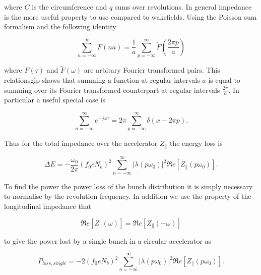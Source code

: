 \documentclass[12pt,a4paper,twopage,openright]{report}
\begin{document}
where $C$ is the circumference and $q$ sums over revolutions. In general impedance is the more useful property to use compared to wakefields. Using the Poisson sum formalism and the following identity

\begin{equation}
\displaystyle\sum\limits_{n = -\infty}^{\infty} F \left( n a \right) = \frac{1}{a} \displaystyle\sum\limits_{p = -\infty}^{\infty} \tilde{F} \left( \frac{2\pi p}{a} \right)
\end{equation}

where $F(\tau)$ and $\tilde{F}(\omega)$ are arbitary Fourier transformed pairs. This relationsgip shows that summing a function at regular intervals $a$ is equal to summing over its Fourier transformed counterpart at regular intervals $\frac{2 \pi}{a}$. In particular a useful special case is

\begin{equation}
\displaystyle\sum\limits_{n = -\infty}^{\infty} e^{-j\omega \tau} = 2\pi \displaystyle\sum\limits_{p = -\infty}^{\infty} \delta \left( x - 2\pi p \right).
\end{equation}

Thus for the total impedance over the accelerator $Z_{\parallel}$ the energy loss is

\begin{equation}
\Delta E = -\frac{\omega_{0}}{2\pi} \left( f_{0} e N_{b}\right)^{2} \displaystyle\sum\limits_{n = -\infty}^{\infty}  \left| \lambda \left( p \omega_{0} \right)  \right|^{2} \Re{}e \left[ Z_{\parallel} \left( p \omega_{0} \right) \right].
\end{equation}

To find the power the power loss of the bunch distribution it is simply necessary to normalise by the revolution frequency. In addition we use the property of the longitudinal impedance that 

\begin{equation}
\Re{}e \left[ Z_{\parallel} \left( \omega \right) \right] =  \Re{}e \left[ Z_{\parallel} \left( -\omega \right) \right]
\end{equation}

to give the power lost by a single bunch in a circular accelerator as 

\begin{equation}
P_{loss, single} = - 2 \left( f_{0} e N_{b}\right)^{2} \displaystyle\sum\limits_{n = -\infty}^{\infty}  \left| \lambda \left( p \omega_{0} \right)  \right|^{2} \Re{}e \left[ Z_{\parallel} \left( p \omega_{0} \right) \right].
\label{eqn:power_loss_single_bunch}
\end{equation}
\end{document}
